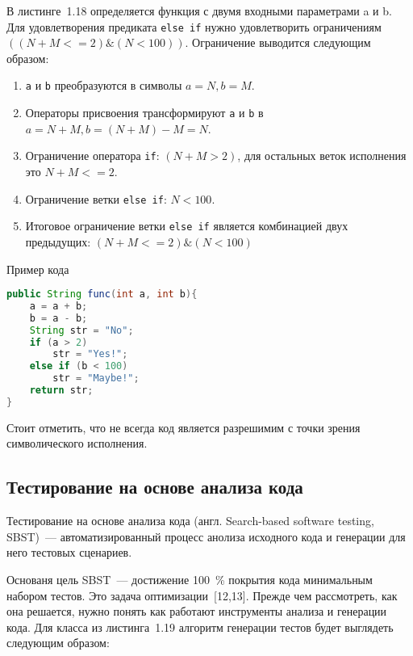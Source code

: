 В листинге~1.18 определяется функция с двумя входными параметрами a и b. Для удовлетворения предиката \texttt{else if} нужно удовлетворить ограничениям \(((N + M <= 2)\&(N < 100))\). Ограничение выводится следующим образом:

\begin{enumerate}
	\item \texttt{a} и \texttt{b} преобразуются в символы  \(a = N, b = M\).
	\item Операторы присвоения трансформируют \texttt{a} и \texttt{b} в  \(a = N + M, b = (N + M) - M = N\).
	\item Ограничение оператора \texttt{if}: \((N + M > 2)\), для остальных веток исполнения это \(N + M <= 2\).
	\item Ограничение ветки \texttt{else if}: \(N < 100\).
	\item Итоговое ограничение ветки \texttt{else if} является комбинацией  двух предыдущих:  \( (N + M <= 2) \& (N < 100)\)
\end{enumerate}

\begin{ListingEnv}[!h]%
	\captiondelim{ } %
	\caption{Пример кода}
	\begin{lstlisting}[language={Java}]
public String func(int a, int b){
	a = a + b;
	b = a - b;
	String str = "No";
	if (a > 2)
		str = "Yes!";
	else if (b < 100)
		str = "Maybe!";
	return str;
}
	\end{lstlisting}
\end{ListingEnv}%

Стоит отметить, что не всегда код является разрешимим с точки зрения символического исполнения.


\subsection{Тестирование на основе анализа кода} 
 
 Тестирование на основе анализа кода (англ. Search-based software testing,  SBST)~--- автоматизированный процесс анолиза исходного кода и генерации для него тестовых сценариев. 
 
 Основаня цель SBST~--- достижение 100~\% покрытия кода минимальным набором тестов. Это задача оптимизации~[12,13]. Прежде чем рассмотреть, как она решается, нужно понять как работают инструменты  анализа и генерации кода. Для класса из листинга~1.19 алгоритм генерации тестов будет выглядеть следующим образом: 
 
